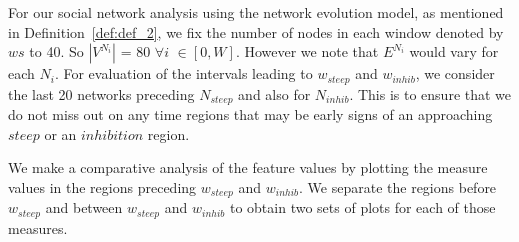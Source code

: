 \documentclass[smallextended]{svjour3}       %
\theoremstyle{definition}
\begin{document}
For our social network analysis using the network evolution model, as mentioned in Definition~\ref{def:def_2}, we fix the number of nodes in each window denoted by $ws$ to 40. So $|V^{N_i}|$ = 80 $\forall i $ $\in [0, W]$. However we note that $E^{N_i}$ would vary for each $N_i$.  For evaluation of the intervals leading to $w_{steep}$ and $w_{inhib}$, we consider the last 20 networks preceding $N_{steep}$ and also for $N_{inhib}$. This is to ensure that we do not miss out on any time regions that may be early signs of an approaching $steep $ or an $inhibition$ region.
 
 We make a comparative analysis of the feature values by plotting the measure values in the regions preceding $w_{steep}$ and $w_{inhib}$. We separate the regions before $w_{steep}$ and between $w_{steep}$ and $w_{inhib}$ to obtain two sets of plots for each of those measures.
 
\end{document}
